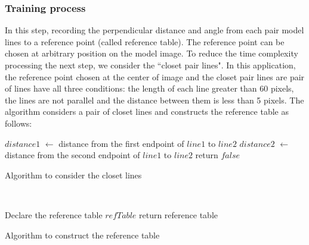 \subsubsection{Training process}
In this step, recording the perpendicular distance and angle from each pair model lines to a reference point (called reference table). The reference point can be chosen at arbitrary position on the model image. To reduce the time complexity processing the next step, we consider the ``closet pair lines". In this application, the reference point chosen at the center of image and the closet pair lines are pair of lines have all three conditions: the length of each line greater than 60 pixels, the lines are not parallel and the distance between them is less than 5 pixels. The algorithm considers a pair of closet lines and constructs the reference table as follows:\\[0.2cm]
\begin{algorithm}[H]
\Indm 
{}
\Indp
$distance1$ $\leftarrow$ distance from the first endpoint of $line1$ to $line2$\;
$distance2$ $\leftarrow$  distance from the second endpoint of $line1$ to $line2$\;
return $false$\;
\caption{Algorithm to consider the closet lines}
\end{algorithm}~\\[0.2cm]
\begin{algorithm}[H]
\Indm 
{}
\Indp
Declare the reference table $refTable$ \;
return reference table \;
\caption{Algorithm to construct the reference table}
\end{algorithm}~\\
